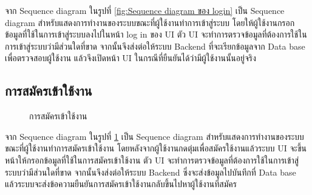 \documentclass[14pt,oneside,openright,a4paper]{cpe-thai-project}
\begin{document}
จาก Sequence diagram ในรูปที่ \ref{fig:Sequence diagram ของ login} เป็น Sequence diagram สำหรับแสดงการทำงานของระบบขณะที่ผู้ใช้งานทำการเข้าสู่ระบบ 
โดยให้ผู้ใช้งานกรอกข้อมูลที่ใช้ในการเข้าสู่ระบบลงไปในหน้า log in ของ UI ตัว UI 
จะทำการตรวจข้อมูลที่ต้องการใช้ในการเข้าสู่ระบบว่ามีส่วนใดที่ขาด จากนั้นจึงส่งต่อให้ระบบ Backend 
ที่จะเรียกข้อมูลจาก Data base เพื่อตรวจสอบผู้ใช้งาน แล้วจึงเปิดหน้า UI ในกรณีที่ยืนยันได้ว่ามีผู้ใช้งานนั้นอยู่จริง


\newpage

\subsection{การสมัครเข้าใช้งาน}

  \begin{figure}[!h]\centering
    \setlength{\fboxrule}{0.5mm} %
    \setlength{\fboxsep}{0.5cm}
    \caption{\centering การสมัครเข้าใช้งาน}\label{fig:regis}
  \end{figure}

  จาก Sequence diagram ในรูปที่ \ref{fig:regis} เป็น Sequence diagram สำหรับแสดงการทำงานของระบบขณะที่ผู้ใช้งานทำการสมัครเข้าใช้งาน โดยหลังจากผู้ใช้งานกดตุ่มเพื่อสมัครใช้งานแล้วระบบ UI จะขึ้นหน้าให้กรอกข้อมูลที่ใช้ในการสมัครเข้าใช้งาน ตัว UI จะทำการตรวจข้อมูลที่ต้องการใช้ในการเข้าสู่ระบบว่ามีส่วนใดที่ขาด จากนั้นจึงส่งต่อให้ระบบ Backend ซึ่งจะส่งข้อมูลไปบันทึกที่ Data base  แล้วระบบจะส่งข้อความยืนยันการสมัครเข้าใช้งานกลับขึ้นไปหาผู้ใช้งานที่สมัคร
\end{document}
